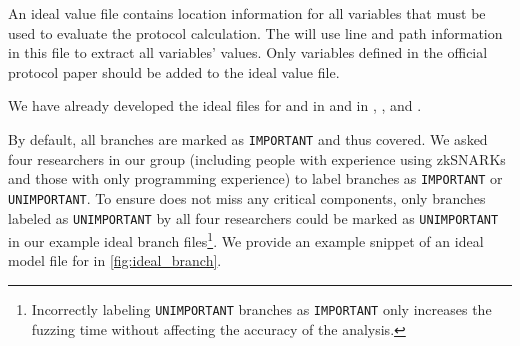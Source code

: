 

%
An ideal value file contains location information for all variables that must be used to evaluate the protocol calculation. The  will use line and path information in this file to extract all variables' values. Only variables defined in the official protocol paper should be added to the ideal value file.


%
We have already developed the ideal files for \pinocchio and  in \libsnark and  in \bellman, \arkworks, and \gnark.

%
By default, all branches are marked as \texttt{IMPORTANT} and thus covered.  We asked four researchers in our group (including people with experience using zkSNARKs and those with only programming experience) to label branches as \texttt{IMPORTANT} or \texttt{UNIMPORTANT}. To ensure \SnarkFuzzer does not miss any critical components, only branches labeled as \texttt{UNIMPORTANT} by all four researchers could be marked as \texttt{UNIMPORTANT} in our example ideal branch files\footnote{Incorrectly labeling \texttt{UNIMPORTANT} branches as \texttt{IMPORTANT} only increases the fuzzing time without affecting the accuracy of the analysis.}. We provide an example snippet of an ideal model file for \libsnark in \autoref{fig:ideal_branch}.

